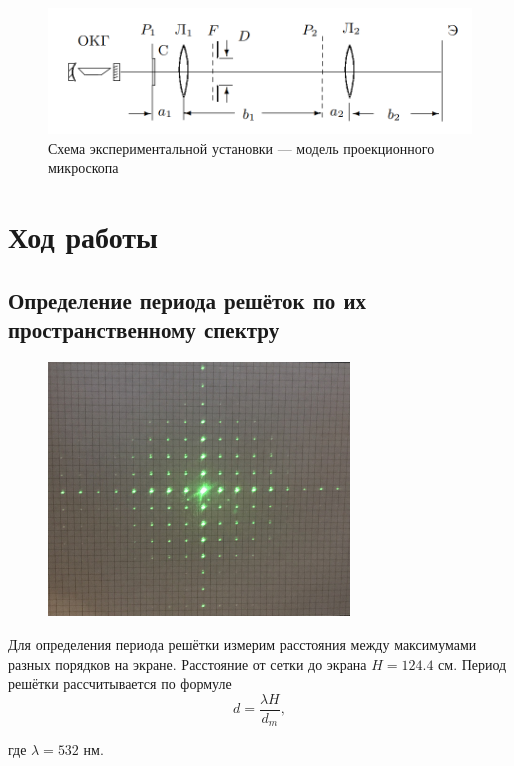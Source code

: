 \documentclass[a4paper,12pt]{article} %
\begin{document}
    \begin{figure}[h]
    \centering
    \includegraphics[width=15cm]{fig1.PNG}
    \caption{Схема экспериментальной установки — модель проекционного
микроскопа}
    \label{fig:vac}
\end{figure}


\section{Ход работы}

 \subsection{Определение периода решёток по их пространственному спектру}
 
\begin{figure}[h]
    \centering
    \includegraphics[width=8cm]{1.jpg}
    \label{filtr}
\end{figure}

\noindent Для определения периода решётки измерим расстояния между максимумами разных порядков на экране. Расстояние от сетки до экрана $H = 124.4$ см. Период решётки рассчитывается по формуле 
    \begin{equation}
        d = \frac{\lambda H}{d_{m}},
    \end{equation}
    
\noindent где $\lambda = 532 \text{ нм}.$

\medskip
\end{document}
